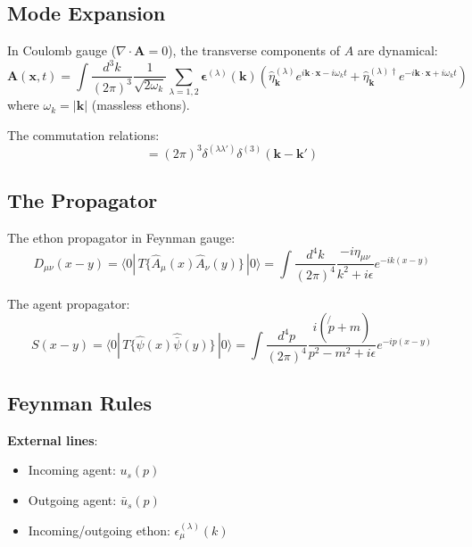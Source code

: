 \documentclass[12pt]{article}
\begin{document}
\subsection{Mode Expansion}

In Coulomb gauge ($\nabla \cdot \mathbf{A} = 0$), the transverse components of $A$ are dynamical:
\begin{equation}
    \mathbf{A}(\mathbf{x}, t) = \int \frac{d^3k}{(2\pi)^3} \frac{1}{\sqrt{2\omega_k}} \sum_{\lambda=1,2} \boldsymbol{\epsilon}^{(\lambda)}(\mathbf{k}) \left( \hat{\eta}_{\mathbf{k}}^{(\lambda)} e^{i\mathbf{k}\cdot\mathbf{x} - i\omega_k t} + \hat{\eta}_{\mathbf{k}}^{(\lambda)\dagger} e^{-i\mathbf{k}\cdot\mathbf{x} + i\omega_k t} \right)
\end{equation}
where $\omega_k = |\mathbf{k}|$ (massless ethons).

The commutation relations:
\begin{equation}
    [\hat{\eta}_{\mathbf{k}}^{(\lambda)}, \hat{\eta}_{\mathbf{k}'}^{(\lambda')\dagger}] = (2\pi)^3 \delta^{(\lambda\lambda')} \delta^{(3)}(\mathbf{k} - \mathbf{k}')
\end{equation}

\subsection{The Propagator}

The ethon propagator in Feynman gauge:
\begin{equation}
    D_{\mu\nu}(x - y) = \langle 0| \, T\{\hat{A}_\mu(x) \hat{A}_\nu(y)\} \, |0\rangle = \int \frac{d^4k}{(2\pi)^4} \frac{-i\eta_{\mu\nu}}{k^2 + i\epsilon} e^{-ik(x-y)}
\end{equation}

The agent propagator:
\begin{equation}
    S(x - y) = \langle 0| \, T\{\hat{\psi}(x) \hat{\bar{\psi}}(y)\} \, |0\rangle = \int \frac{d^4p}{(2\pi)^4} \frac{i(\not{p} + m)}{p^2 - m^2 + i\epsilon} e^{-ip(x-y)}
\end{equation}

\subsection{Feynman Rules}

\textbf{External lines}:
\begin{itemize}
    \item Incoming agent: $u_s(p)$
    \item Outgoing agent: $\bar{u}_s(p)$
    \item Incoming/outgoing ethon: $\epsilon_\mu^{(\lambda)}(k)$
\end{itemize}
\end{document}
